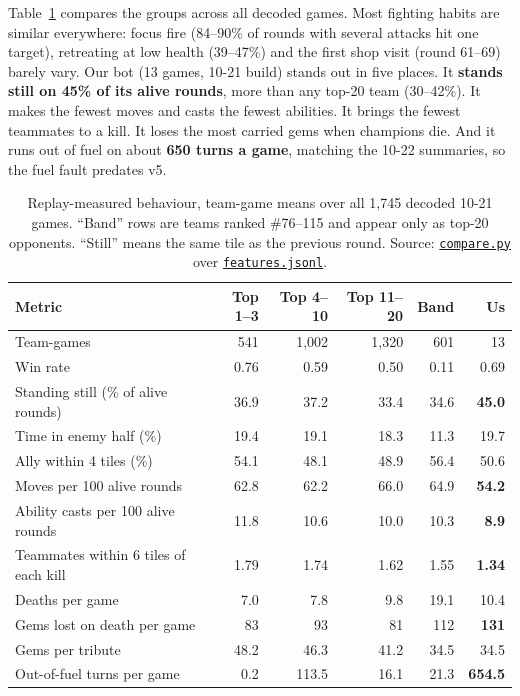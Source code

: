 \documentclass[11pt,a4paper]{article}
\newcommand{\viz}{file:///private/tmp/claude-501/-Users-tristanbasri-Desktop-Code-cambridge-battlecode-s2/b3f4cb6b-e46a-405f-957c-42c44c05c8dc/scratchpad/viz2}
\begin{document}
Table~\ref{tab:replay} compares the groups across all decoded games. Most fighting habits are similar everywhere: focus fire (84--90\% of rounds with several attacks hit one target), retreating at low health (39--47\%) and the first shop visit (round 61--69) barely vary. Our bot (13 games, 10-21 build) stands out in five places. It \textbf{stands still on 45\% of its alive rounds}, more than any top-20 team (30--42\%). It makes the fewest moves and casts the fewest abilities. It brings the fewest teammates to a kill. It loses the most carried gems when champions die. And it runs out of fuel on about \textbf{650 turns a game}, matching the 10-22 summaries, so the fuel fault predates v5.

\begin{table}[H]
\centering\small
\caption{Replay-measured behaviour, team-game means over all 1,745 decoded 10-21 games. ``Band'' rows are teams ranked \#76--115 and appear only as top-20 opponents. ``Still'' means the same tile as the previous round. Source: \href{\viz/an/compare.py}{\texttt{compare.py}} over \href{\viz/an/features.jsonl}{\texttt{features.jsonl}}.}
\begin{tabularx}{\linewidth}{@{}>{\raggedright\arraybackslash}X rrrrr@{}}
\toprule
Metric & Top 1--3 & Top 4--10 & Top 11--20 & Band & Us\\
\midrule
Team-games & 541 & 1,002 & 1,320 & 601 & 13\\
Win rate & 0.76 & 0.59 & 0.50 & 0.11 & 0.69\\
Standing still (\% of alive rounds) & 36.9 & 37.2 & 33.4 & 34.6 & \textbf{45.0}\\
Time in enemy half (\%) & 19.4 & 19.1 & 18.3 & 11.3 & 19.7\\
Ally within 4 tiles (\%) & 54.1 & 48.1 & 48.9 & 56.4 & 50.6\\
Moves per 100 alive rounds & 62.8 & 62.2 & 66.0 & 64.9 & \textbf{54.2}\\
Ability casts per 100 alive rounds & 11.8 & 10.6 & 10.0 & 10.3 & \textbf{8.9}\\
Teammates within 6 tiles of each kill & 1.79 & 1.74 & 1.62 & 1.55 & \textbf{1.34}\\
Deaths per game & 7.0 & 7.8 & 9.8 & 19.1 & 10.4\\
Gems lost on death per game & 83 & 93 & 81 & 112 & \textbf{131}\\
Gems per tribute & 48.2 & 46.3 & 41.2 & 34.5 & 34.5\\
Out-of-fuel turns per game & 0.2 & 113.5 & 16.1 & 21.3 & \textbf{654.5}\\
\bottomrule
\end{tabularx}
\label{tab:replay}
\end{table}
\end{document}
